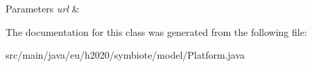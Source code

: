 \begin{DoxyParams}{Parameters}
{\em url} & \\
\hline
\end{DoxyParams}


The documentation for this class was generated from the following file\+:\begin{DoxyCompactItemize}
\item 
src/main/java/eu/h2020/symbiote/model/Platform.\+java\end{DoxyCompactItemize}
